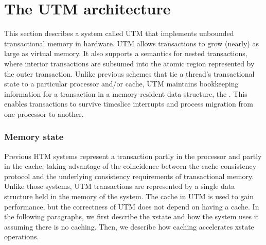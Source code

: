 

\section{The UTM architecture}\label{sec:utm}

This section describes a system called UTM that implements
unbounded transactional memory in hardware.  UTM allows
transactions to grow (nearly) as large as virtual memory.  It also
supports a semantics for nested transactions, where interior
transactions are subsumed into the atomic region represented by the
outer transaction.  Unlike previous schemes that tie a thread's
transactional state to a particular processor and/or cache, UTM
maintains bookkeeping information for a transaction in a
memory-resident data structure, the .  This
enables transactions to survive timeslice interrupts and process
migration from one processor to another.


\subsubsection{Memory state}

Previous HTM systems \cite{Knight86,HerlihyMo93} represent a
transaction partly in the processor and partly in the cache, taking
advantage of the coincidence between the cache-consistency protocol
and the underlying consistency requirements of transactional memory.
Unlike those systems, UTM transactions are represented by a single
 data structure held in the memory of the system.  The
cache in UTM is used to gain performance, but the correctness of
UTM does not depend on having a cache.  In the following
paragraphs, we first describe the xstate and how the system uses it
assuming there is no caching.  Then, we describe how caching
accelerates xstate operations.


